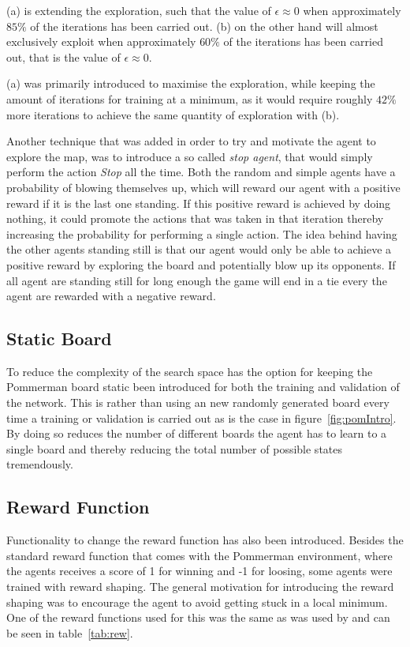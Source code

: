 (a) is extending the exploration, such that the value of $\epsilon \approx 0$ when approximately $85\%$ of the iterations has been carried out. (b) on the other hand will almost exclusively exploit when approximately $60\%$ of the iterations has been carried out, that is the value of $\epsilon \approx 0$.

(a) was primarily introduced to maximise the exploration, while keeping the amount of iterations for training at a minimum, as it would require roughly $42\%$ more iterations to achieve the same quantity of exploration with (b).

Another technique that was added in order to try and motivate the agent to explore the map, was to introduce a so called \emph{stop agent}, that would simply perform the action \emph{Stop} all the time. Both the random and simple agents have a probability of blowing themselves up, which will reward our agent with a positive reward if it is the last one standing. If this positive reward is achieved by doing nothing, it could promote the actions that was taken in that iteration thereby increasing the probability for performing a single action. The idea behind having the other agents standing still is that our agent would only be able to achieve a positive reward by exploring the board and potentially blow up its opponents. If all agent are standing still for long enough the game will end in a tie every the agent are rewarded with a negative reward.

\subsection{Static Board}
\label{sec:static}
To reduce the complexity of the search space has the option for keeping the Pommerman board static been introduced for both the training and validation of the network. This is rather than using an new randomly generated board every time a training or validation is carried out as is the case in figure~\ref{fig:pomIntro}. By doing so reduces the number of different boards the agent has to learn to a single board and thereby reducing the total number of possible states tremendously.

\subsection{Reward Function}
Functionality to change the reward function has also been introduced. Besides the standard reward function that comes with the Pommerman environment, where the agents receives a score of 1 for winning and -1 for loosing, some agents were trained with reward shaping. The general motivation for introducing the reward shaping was to encourage the agent to avoid getting stuck in a local minimum. One of the reward functions used for this was the same as was used by \cite{kormelink2018exploration} and can be seen in table~\ref{tab:rew}. 


